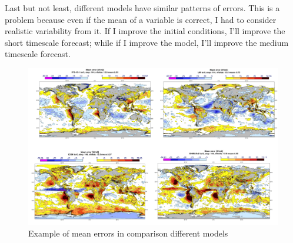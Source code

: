 Last but not least, different models have similar patterns of errors. This is a problem because even if the mean of a variable is correct, I had to consider realistic variability from it. If I improve the initial conditions, I'll improve the short timescale forecast; while if I improve the model, I'll improve the medium timescale forecast. 
\begin{figure}[h!]
    \centering
    \includegraphics[width=0.5\linewidth]{uploads/image7.png}
    \caption{Example of mean errors in comparison different models}
    \label{fig:enter-label}
\end{figure}
